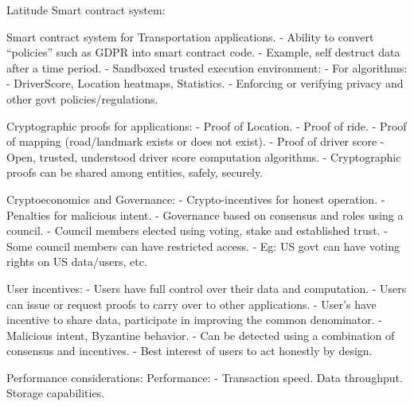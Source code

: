\noindent
{\textsf Latitude Smart contract system:}

Smart contract system for Transportation applications.
 - Ability to convert “policies” such as GDPR into smart contract code.
 - Example, self destruct data after a time period.
 - Sandboxed trusted execution environment:
 - For algorithms:
   - DriverScore, Location heatmaps, Statistics.
   - Enforcing or verifying privacy and other govt policies/regulations.

Cryptographic proofs for applications:
 - Proof of Location. 
 - Proof of ride. 
 - Proof of mapping 
      (road/landmark exists or does not exist).
 - Proof of driver score 
 - Open, trusted, understood driver score computation algorithms.
 - Cryptographic proofs can be shared among entities, safely, securely.

\noindent
{\textsf Cryptoeconomics and Governance:}
 - Crypto-incentives for honest operation.
 - Penalties for malicious intent.
 - Governance based on consensus and roles using a council.
 - Council members elected using voting, stake and established trust.
 - Some council members can have restricted access.
 - Eg: US govt can have voting rights on US data/users, etc.

User incentives:
 - Users have full control over their data and computation.
 - Users can issue or request proofs to carry over to other applications.
 - User’s have incentive to share data, participate in improving the common denominator.
 - Malicious intent, Byzantine behavior.
   - Can be detected using a combination of consensus and incentives.
   - Best interest of users to act honestly by design.


\noindent
{\textsf Performance considerations:}
Performance:
- Transaction speed. Data throughput. Storage capabilities.
